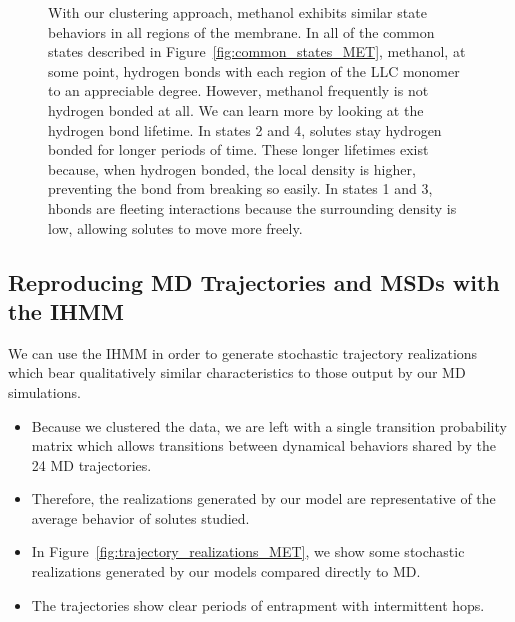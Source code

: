 \documentclass{article}
\begin{document}
\begin{figure}
\begin{subfigure}{0.45\textwidth}
  \caption{}\label{fig:hbond_lifetimes_density_MET}
  \end{subfigure}
  \caption{With our clustering approach, methanol exhibits similar state behaviors
  in all regions of the membrane. In all of the common states described in 
  Figure~\ref{fig:common_states_MET}, methanol, at some point, hydrogen bonds with 
  each region of the LLC monomer to an appreciable degree. However, methanol frequently
  is not hydrogen bonded at all.
  We can learn more by looking at the hydrogen bond lifetime. In states 2 and 4, solutes
  stay hydrogen bonded for longer periods of time.
  These longer lifetimes exist because, when hydrogen bonded, the local density is higher, preventing the 
  bond from breaking so easily. In states 1 and 3, hbonds are fleeting interactions because
  the surrounding density is low, allowing solutes to move more freely.
  }\label{fig:hbond_pichart}
  \end{figure}
    
  \subsection{Reproducing MD Trajectories and MSDs with the IHMM}
  
  We can use the IHMM in order to generate stochastic trajectory realizations
  which bear qualitatively similar characteristics to those output
  by our MD simulations.
  \begin{itemize}
    \item Because we clustered the data, we are left with a single transition
    probability matrix which allows transitions between dynamical behaviors
    shared by the 24 MD trajectories.
    \item Therefore, the realizations generated by our model are representative
    of the average behavior of solutes studied.
    \item In Figure~\ref{fig:trajectory_realizations_MET}, we show some stochastic
    realizations generated by our models compared directly to MD.
    \item The trajectories show clear periods of entrapment with intermittent hops.
  \end{itemize}
  
\end{document}
